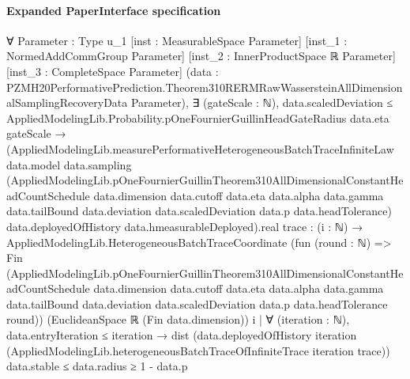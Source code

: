 \documentclass[10pt]{article}
\begin{document}
\paragraph{Expanded PaperInterface specification}
\begin{ReviewVerbatim}
∀ {Parameter : Type u_1} [inst : MeasurableSpace Parameter] [inst_1 : NormedAddCommGroup Parameter]
  [inst_2 : InnerProductSpace ℝ Parameter] [inst_3 : CompleteSpace Parameter]
  (data : PZMH20PerformativePrediction.Theorem310RERMRawWassersteinAllDimensionalSamplingRecoveryData Parameter),
  ∃ (gateScale : ℕ),
    data.scaledDeviation ≤ AppliedModelingLib.Probability.pOneFournierGuillinHeadGateRadius data.eta gateScale →
      (AppliedModelingLib.measurePerformativeHeterogeneousBatchTraceInfiniteLaw data.model data.sampling
              (AppliedModelingLib.pOneFournierGuillinTheorem310AllDimensionalConstantHeadCountSchedule data.dimension
                data.cutoff data.eta data.alpha data.gamma data.tailBound data.deviation data.scaledDeviation data.p
                data.headTolerance)
              data.deployedOfHistory data.hmeasurableDeployed).real
          {trace :
            (i : ℕ) →
              AppliedModelingLib.HeterogeneousBatchTraceCoordinate
                (fun (round : ℕ) =>
                  Fin
                    (AppliedModelingLib.pOneFournierGuillinTheorem310AllDimensionalConstantHeadCountSchedule
                      data.dimension data.cutoff data.eta data.alpha data.gamma data.tailBound data.deviation
                      data.scaledDeviation data.p data.headTolerance round))
                (EuclideanSpace ℝ (Fin data.dimension)) i |
            ∀ (iteration : ℕ),
              data.entryIteration ≤ iteration →
                dist
                    (data.deployedOfHistory iteration
                      (AppliedModelingLib.heterogeneousBatchTraceOfInfiniteTrace iteration trace))
                    data.stable ≤
                  data.radius} ≥
        1 - data.p
\end{ReviewVerbatim}
\end{document}
